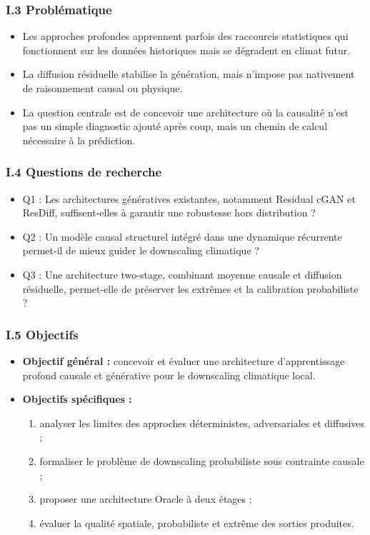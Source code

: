 \documentclass[12pt,a4paper]{article}
\begin{document}
\subsubsection*{I.3 Probl\'ematique}
\begin{itemize}
    \item Les approches profondes apprennent parfois des raccourcis statistiques qui fonctionnent sur les donn\'ees historiques mais se d\'egradent en climat futur.
    \item La diffusion r\'esiduelle stabilise la g\'en\'eration, mais n'impose pas nativement de raisonnement causal ou physique.
    \item La question centrale est de concevoir une architecture o\`u la causalit\'e n'est pas un simple diagnostic ajout\'e apr\`es coup, mais un chemin de calcul n\'ecessaire \`a la pr\'ediction.
\end{itemize}

\subsubsection*{I.4 Questions de recherche}
\begin{itemize}
    \item Q1 : Les architectures g\'en\'eratives existantes, notamment Residual cGAN et ResDiff, suffisent-elles \`a garantir une robustesse hors distribution ?
    \item Q2 : Un mod\`ele causal structurel int\'egr\'e dans une dynamique r\'ecurrente permet-il de mieux guider le downscaling climatique ?
    \item Q3 : Une architecture two-stage, combinant moyenne causale et diffusion r\'esiduelle, permet-elle de pr\'eserver les extr\^emes et la calibration probabiliste ?
\end{itemize}

\subsubsection*{I.5 Objectifs}
\begin{itemize}
    \item \textbf{Objectif g\'en\'eral :} concevoir et \'evaluer une architecture d'apprentissage profond causale et g\'en\'erative pour le downscaling climatique local.
    \item \textbf{Objectifs sp\'ecifiques :}
    \begin{enumerate}
        \item analyser les limites des approches d\'eterministes, adversariales et diffusives ;
        \item formaliser le probl\`eme de downscaling probabiliste sous contrainte causale ;
        \item proposer une architecture Oracle \`a deux \'etages ;
        \item \'evaluer la qualit\'e spatiale, probabiliste et extr\^eme des sorties produites.
    \end{enumerate}
\end{itemize}
\end{document}
